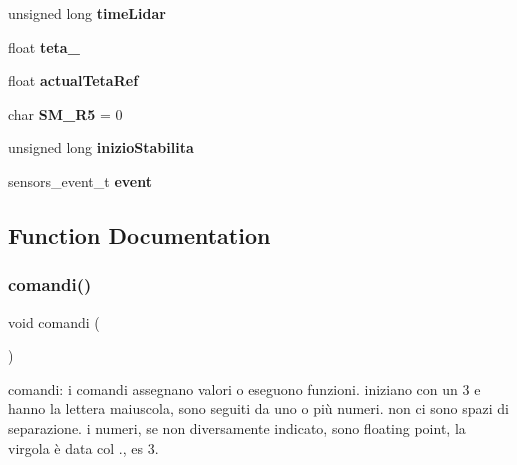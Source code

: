 \begin{DoxyCompactItemize}
unsigned long {\bfseries time\+Lidar}
\item 
\mbox{\label{ari_pi__2_d_c__esp__08_8ino_ab50fa34f1f6d47cde8715ac543a3b0dd}} 
float {\bfseries teta\+\_\+}
\item 
\mbox{\label{ari_pi__2_d_c__esp__08_8ino_ae431043be26faf1019f48badf3fbfc45}} 
float {\bfseries actual\+Teta\+Ref}
\item 
\mbox{\label{ari_pi__2_d_c__esp__08_8ino_ad2b58fa9c2d105a6d47c2c3b778557c1}} 
char {\bfseries S\+M\+\_\+\+R5} = 0
\item 
\mbox{\label{ari_pi__2_d_c__esp__08_8ino_a91db8b0a01ba006126af6bb35384e18f}} 
unsigned long {\bfseries inizio\+Stabilita}
\item 
\mbox{\label{ari_pi__2_d_c__esp__08_8ino_a40ecda65c4ebce49fa139666f210bef0}} 
sensors\+\_\+event\+\_\+t {\bfseries event}
\end{DoxyCompactItemize}


\subsection{Function Documentation}
\mbox{\label{ari_pi__2_d_c__esp__08_8ino_a8865513d32ebc241dbe80e5bf49ff775}} 
\subsubsection{\texorpdfstring{comandi()}{comandi()}}
{\footnotesize\ttfamily void comandi (\begin{DoxyParamCaption}{ }\end{DoxyParamCaption})}



comandi\+: i comandi assegnano valori o eseguono funzioni. iniziano con un 3 e hanno la lettera maiuscola, sono seguiti da uno o più numeri. non ci sono spazi di separazione. i numeri, se non diversamente indicato, sono floating point, la virgola è data col \textquotesingle{}.\textquotesingle{}, es 3. 


